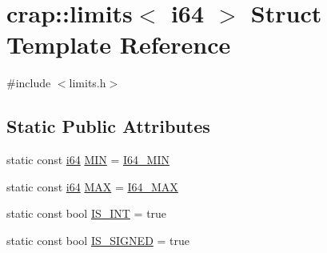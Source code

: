 \hypertarget{structcrap_1_1limits_3_01i64_01_4}{\section{crap\-:\-:limits$<$ i64 $>$ Struct Template Reference}
\label{structcrap_1_1limits_3_01i64_01_4}
}


{\ttfamily \#include $<$limits.\-h$>$}

\subsection*{Static Public Attributes}
\begin{DoxyCompactItemize}
\item 
static const \hyperlink{types_8h_a85cb35fbe5bf2961d7ad5f26814a91a2}{i64} \hyperlink{structcrap_1_1limits_3_01i64_01_4_a50f4434a55e01e7dae98941d5595a6b3}{M\-I\-N} = \hyperlink{types_8h_a0427de163db0e1a357eee973c48bdfb5}{I64\-\_\-\-M\-I\-N}
\item 
static const \hyperlink{types_8h_a85cb35fbe5bf2961d7ad5f26814a91a2}{i64} \hyperlink{structcrap_1_1limits_3_01i64_01_4_af68dda1c50195c3f58e4517fc21d69f4}{M\-A\-X} = \hyperlink{types_8h_a5f660b55f835b170812ab67f556e9a5a}{I64\-\_\-\-M\-A\-X}
\item 
static const bool \hyperlink{structcrap_1_1limits_3_01i64_01_4_a1c75e13842bd5be8dc607703aa3bde20}{I\-S\-\_\-\-I\-N\-T} = true
\item 
static const bool \hyperlink{structcrap_1_1limits_3_01i64_01_4_abc50902329af13ea9041e31b99530519}{I\-S\-\_\-\-S\-I\-G\-N\-E\-D} = true
\end{DoxyCompactItemize}


